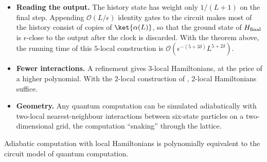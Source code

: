 \documentclass[handoutsbeamer.tex]{subfiles}
\begin{document}
\begin{frame}
\onp{\footnotesize}
\begin{itemize}\setlength\itemsep{0.3em}
    \item \textbf{Reading the output.} The history state has weight only $1/(L+1)$ on the final step. Appending $\mathcal O(L/\epsilon)$ identity gates to the circuit makes most of the history consist of copies of $\ket{\alpha(L)}$, so that the ground state of $H_{\rm final}$ is $\epsilon$-close to the output after the clock is discarded. With the theorem above, the running time of this $5$-local construction is $\mathcal O(\epsilon^{-(5+3\delta)}L^{5+2\delta})$.
    \item \textbf{Fewer interactions.} A refinement gives $3$-local Hamiltonians, at the price of a higher polynomial. With the $2$-local construction of \citet{kempe2006complexity}, $2$-local Hamiltonians suffice.
    \item \textbf{Geometry.} Any quantum computation can be simulated adiabatically with two-local nearest-neighbour interactions between six-state particles on a two-dimensional grid, the computation ``snaking'' through the lattice.
\end{itemize}
\begin{thm}\label{thm:ch04:equivalence}
Adiabatic computation with local Hamiltonians is polynomially equivalent to the circuit model of quantum computation.
\end{thm}
\end{frame}
\end{document}
